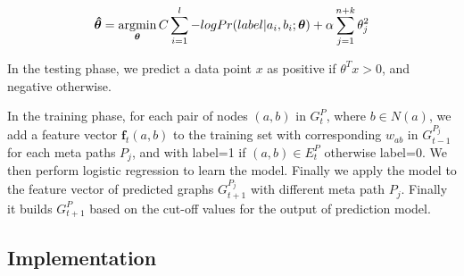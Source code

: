 
\begin{equation}
\boldsymbol{\hat{\theta}} = 
\operatorname*{argmin}\limits_{\boldsymbol{\theta}}C\sum_{i=1}^l -log Pr(label |a_i, b_i; \boldsymbol{\theta}) + \alpha \sum_{j=1}^{n+k} \theta_j^2
\end{equation}
 
In the testing phase, we predict a data point $x$ as positive if $\theta^Tx > 0$, and negative otherwise.




In the training phase, for each pair of nodes $(a,b)$ in $G^{P}_{t}$, where $b \in N(a)$, we add a feature vector $\boldsymbol{f}_t(a,b)$ to the training set with corresponding $w_{ab}$ in $G^{P_j}_{t-1}$ for each meta paths $P_j$, and with label=1 if $(a,b) \in E^{P}_{t}$ otherwise label=0. We then perform logistic regression to learn the model. Finally we apply the model to the feature vector of predicted graphs $G^{P_j}_{t+1}$ with different meta path $P_j$. Finally it builds $G^{P}_{t+1}$ based on the cut-off values for the output of prediction model.








\subsection{Implementation}

